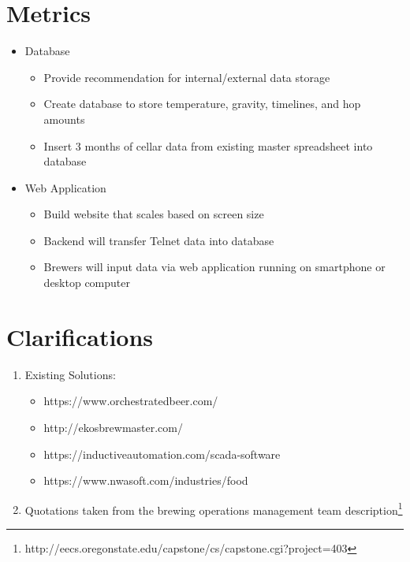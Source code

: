 \documentclass[draftclsnofoot,onecolumn,letterpaper,10pt]{IEEEtran}
\begin{document}
\section{\textbf{Metrics}}
\begin{itemize}
\item {Database}
\begin{itemize}
\item {Provide recommendation for internal/external data storage}
\item {Create database to store temperature, gravity, timelines, and hop amounts}
\item {Insert 3 months of cellar data from existing master spreadsheet into database}
\end{itemize}
\item{Web Application}
\begin{itemize}
\item {Build website that scales based on screen size}
\item {Backend will transfer Telnet data into database}
\item {Brewers will input data via web application running on smartphone or desktop computer}
\end{itemize}
\end{itemize}

\section{\textbf{Clarifications}}
\begin{enumerate}
	\item {Existing Solutions:}
	\begin{itemize}
		\item {https://www.orchestratedbeer.com/}
		\item {http://ekosbrewmaster.com/}
		\item {https://inductiveautomation.com/scada-software}
		\item {https://www.nwasoft.com/industries/food}
	\end{itemize}
	\item {Quotations taken from the brewing operations management team description\footnote{http://eecs.oregonstate.edu/capstone/cs/capstone.cgi?project=403}}
\end{enumerate}
\end{document}
